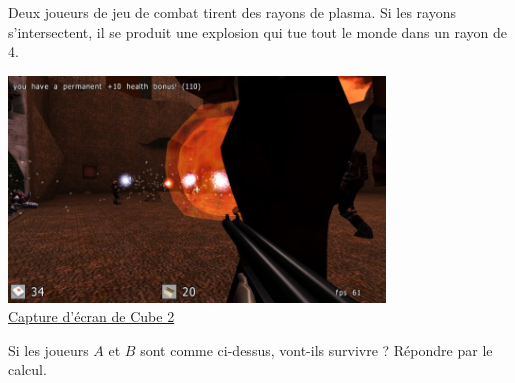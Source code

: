 
\begin{exercice}\label{exosmath-0339}

    Deux joueurs de jeu de combat tirent des rayons de plasma. Si les rayons s'intersectent, il se produit une explosion qui tue tout le monde dans un rayon de \unit{4}{\meter}. 



    \begin{multicols}{2}
\includegraphics[width=10cm]{screenshot_5891783.png}\\
\href{http://sauerbraten.org/}{Capture d'écran de Cube 2}

\columnbreak



    \end{multicols}

    Si les joueurs \( A\) et \( B\) sont comme ci-dessus, vont-ils survivre ? Répondre par le calcul.

\end{exercice}

